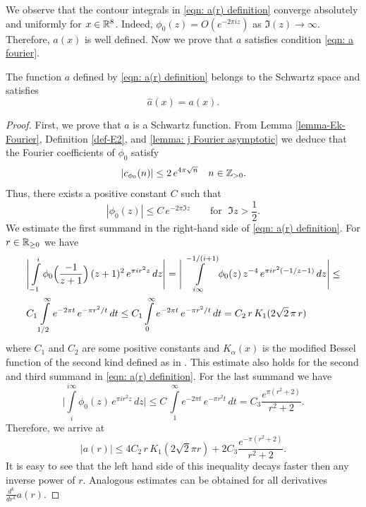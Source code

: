 We observe that the contour integrals in \eqref{eqn: a(r) definition} converge absolutely and uniformly for  $x\in\mathbb{R}^8$. Indeed,
$\phi_0(z)=O(e^{-2\pi i z})$ as $\Im(z)\to \infty$. Therefore, $a(x)$ is well defined. Now we prove that $a$ satisfies condition \eqref{eqn: a fourier}.
\begin{proposition}\label{prop: a(r) Fourier}

The function $a$ defined by \eqref{eqn: a(r) definition} belongs to the Schwartz space and satisfies $$\widehat{a}(x)=a(x). $$
\end{proposition}
\begin{proof}
First, we prove that $a$ is a Schwartz function. From Lemma \ref{lemma-Ek-Fourier}, Definition \ref{def-E2}, and \ref{lemma: j Fourier asymptotic} we deduce that the Fourier coefficients of $\phi_0$ satisfy
$$|c_{\phi_0}(n)|\leq2\,e^{4\pi\sqrt{n}}\quad n\in\mathbb{Z}_{>0}.$$ Thus, there exists a positive constant $C$ such that
$$|\phi_0(z)|\leq C\,e^{-2\pi \Im{z}}\qquad \mbox{for } \; \Im{z}>\frac 12.$$
We estimate the first summand in the right-hand side of \eqref{eqn: a(r) definition}.  For $r\in\mathbb{R}_{\geq 0}$ we have
\begin{align}&\Bigg|\int\limits_{-1}^{i}\phi_0\Big(\frac{-1}{z+1}\Big)\,(z+1)^2\,e^{\pi i r^2 z}\,dz\Bigg|=\Bigg|\int\limits_{i\infty}^{-1/(i+1)}\phi_0(z)\,z^{-4}\,e^{\pi i r^2 (-1/z-1)}\,dz\Bigg|\leq \notag\\
  &C_1\int\limits_{1/2}^{\infty}e^{-2\pi t}\,e^{-\pi  r^2/t}\,dt\leq C_1\int\limits_{0}^{\infty}e^{-2\pi t}\,e^{-\pi  r^2/t}\,dt=C_2\,r\,K_1(2\sqrt{2}\,\pi\,r)\notag
\end{align}
where $C_1$ and $C_2$ are some positive constants and $K_\alpha(x)$ is the modified Bessel function of the second kind defined as in \cite[Section~9.6]{Abramowitz}. This estimate also holds for the second and third summand in \eqref{eqn: a(r) definition}.
For the last summand we have
$$ \Bigg|\int\limits_{i}^{i\infty}\phi_0(z)\,e^{\pi i r^2 z}\,dz\Bigg|\leq C\,\int\limits_{1}^{\infty} e^{-2\pi t}\,e^{-\pi r^2 t}\,dt=C_3\frac{e^{\pi(r^2+2)}}{r^2+2}.$$
Therefore, we arrive at
$$|a(r)|\leq 4C_2\,r\,K_1(2\sqrt{2}\pi r)+2C_3\frac{e^{-\pi(r^2+2)}}{r^2+2}.$$
It is easy to see that the left hand side of this inequality decays faster then any inverse power of $r$. Analogous estimates can be obtained for all derivatives $\frac{d^k}{dr^k}a(r)$.


\end{proof}

